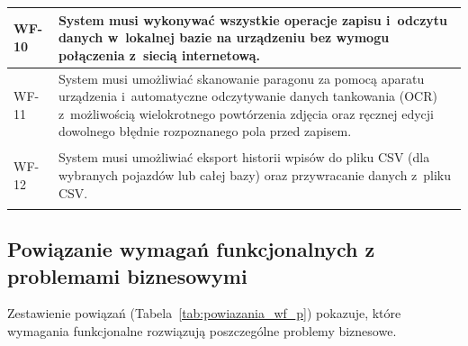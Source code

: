 \begin{longtable}{|>{\centering\arraybackslash}m{1.4cm}|m{\dimexpr\linewidth - 1.4cm - 4\tabcolsep - 3\arrayrulewidth\relax}|}
    \hline
    \hypertarget{wf:WF-10}{WF-10} & System musi wykonywać wszystkie operacje zapisu i~odczytu danych w~lokalnej bazie na urządzeniu bez wymogu połączenia z~siecią internetową. \\
    \hline
    \hypertarget{wf:WF-11}{WF-11} & System musi umożliwiać skanowanie paragonu za pomocą aparatu urządzenia i~automatyczne odczytywanie danych tankowania (OCR) z~możliwością wielokrotnego powtórzenia zdjęcia oraz ręcznej edycji dowolnego błędnie rozpoznanego pola przed zapisem. \\
    \hline
    \hypertarget{wf:WF-12}{WF-12} & System musi umożliwiać eksport historii wpisów do pliku CSV (dla wybranych pojazdów lub całej bazy) oraz przywracanie danych z~pliku CSV. \\
    \hline
\end{longtable}
\endgroup

\subsection{Powiązanie wymagań funkcjonalnych z problemami biznesowymi}
\label{subsec:powiazanie_wf_p}

Zestawienie powiązań (Tabela~\ref{tab:powiazania_wf_p}) pokazuje, które wymagania funkcjonalne rozwiązują poszczególne problemy biznesowe.

